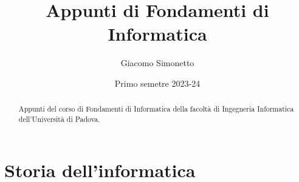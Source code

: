 \documentclass{article}
\title{Appunti di Fondamenti di Informatica}
\author{Giacomo Simonetto}
\date{Primo semetre 2023-24}
\begin{document}
\maketitle
\begin{abstract}
	Appunti del corso di Fondamenti di Informatica della facoltà di Ingegneria Informatica dell'Università di Padova.
\end{abstract}

\newpage

\tableofcontents

\newpage

\section{Storia dell'informatica}
\end{document}
